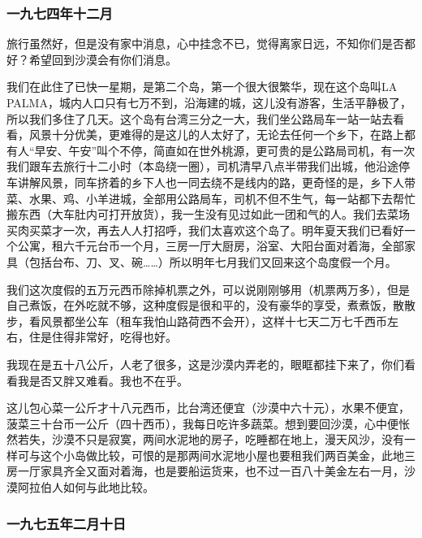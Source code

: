 \subsubsection{一九七四年十二月}

\par {}
\par 旅行虽然好，但是没有家中消息，心中挂念不已，觉得离家日远，不知你们是否都好？希望回到沙漠会有你们消息。
\par 我们在此住了已快一星期，是第二个岛，第一个很大很繁华，现在这个岛叫LA PALMA，城内人口只有七万不到，沿海建的城，这儿没有游客，生活平静极了，所以我们多住了几天。这个岛有台湾三分之一大，我们坐公路局车一站一站去看看，风景十分优美，更难得的是这儿的人太好了，无论去任何一个乡下，在路上都有人“早安、午安”叫个不停，简直如在世外桃源，更可贵的是公路局司机，有一次我们跟车去旅行十二小时（本岛绕一圈），司机清早八点半带我们出城，他沿途停车讲解风景，同车挤着的乡下人也一同去绕不是线内的路，更奇怪的是，乡下人带菜、水果、鸡、小羊进城，全部用公路局车，司机不但不生气，每一站都下去帮忙搬东西（大车肚内可打开放货），我一生没有见过如此一团和气的人。我们去菜场买肉买菜才一次，再去人人打招呼，我们太喜欢这个岛了。明年夏天我们已看好一个公寓，租六千元台币一个月，三房一厅大厨房，浴室、大阳台面对着海，全部家具（包括台布、刀、叉、碗……）所以明年七月我们又回来这个岛度假一个月。
\par 我们这次度假的五万元西币除掉机票之外，可以说刚刚够用（机票两万多），但是自己煮饭，在外吃就不够，这种度假是很和平的，没有豪华的享受，煮煮饭，散散步，看风景都坐公车（租车我怕山路荷西不会开），这样十七天二万七千西币左右，住是住得非常好，吃得也好。
\par 我现在是五十八公斤，人老了很多，这是沙漠内弄老的，眼眶都挂下来了，你们看看我是否又胖又难看。我也不在乎。
\par 这儿包心菜一公斤才十八元西币，比台湾还便宜（沙漠中六十元），水果不便宜，菠菜三十台币一公斤（四十西币），我每日吃许多蔬菜。想到要回沙漠，心中便怅然若失，沙漠不只是寂寞，两间水泥地的房子，吃睡都在地上，漫天风沙，没有一样可与这个小岛做比较，可恨的是那两间水泥地小屋也要租我们两百美金，此地三房一厅家具齐全又面对着海，也是要船运货来，也不过一百八十美金左右一月，沙漠阿拉伯人如何与此地比较。
\par {}

\subsubsection{一九七五年二月十日}

